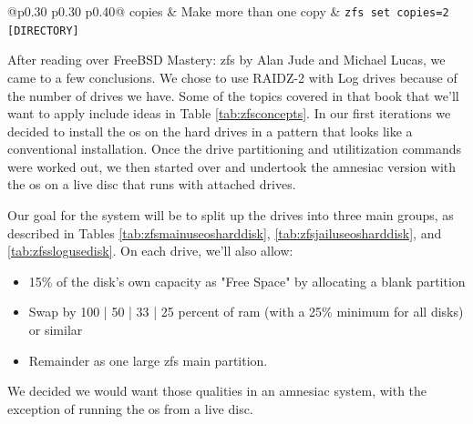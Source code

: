 \begin{table}
\begin{tabular}{@{}p{0.30\linewidth} p{0.30\linewidth} p{0.40\linewidth}@{}}
    copies & Make more than one copy & \texttt{zfs set copies=2 [DIRECTORY]}  \\
    \bottomrule
  \end{tabular}
\end{table}

After reading over FreeBSD Mastery:  \gls{zfs} by Alan Jude and Michael Lucas, we came to a few conclusions.  We chose to use RAIDZ-2 with Log drives because of the number of drives we have.  Some of the topics covered in that book that we'll want to apply include ideas in Table \ref{tab:zfsconcepts}.  In our first iterations we decided to install the \gls{os} on the hard drives in a pattern that looks like a conventional installation.  Once the drive partitioning and utilitization commands were worked out, we then started over and undertook the  \gls{amnesiac} version with the \gls{os} on a live disc that runs with attached drives.


Our goal for the system will be to split up the drives into three main groups, as described in Tables \ref{tab:zfsmainuseosharddisk}, \ref{tab:zfsjailuseosharddisk}, and \ref{tab:zfsslogusedisk}.  On each drive, we'll also allow:
\begin{itemize}
	\item 15\% of the disk's own capacity as "Free Space" by allocating a blank \gls{partition}
	\item Swap by 100 | 50 | 33 | 25 percent of \gls{ram} (with a 25\% minimum for all disks) or similar
	\item Remainder as one large \gls{zfs} main \gls{partition}.
\end{itemize}
We decided we would want those qualities in an  \gls{amnesiac} system, with the exception of running the \gls{os} from a live disc.

